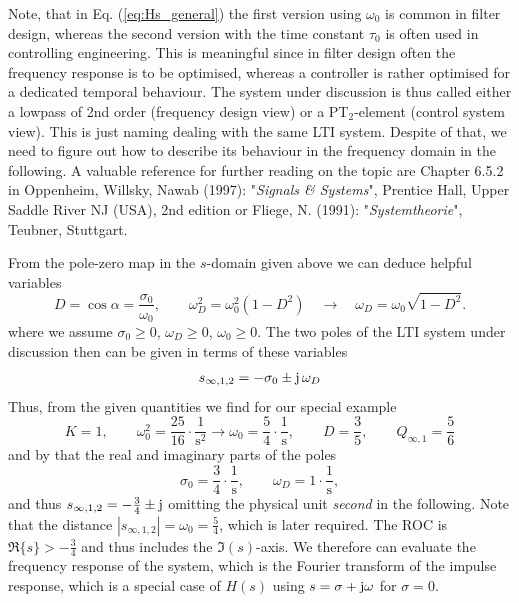 \documentclass[11pt,a4paper,DIV=12]{scrartcl}
\numberwithin{equation}{section}
\numberwithin{figure}{section}
\newcommand{\eq}[1]{Eq. (\ref{#1})} %
\begin{document}
\begin{mdframed}
Note, that in \eq{eq:Hs_general} the first version using $\omega_0$ is
common in filter design, whereas the second version with the time
constant $\tau_0$ is often used in controlling engineering.
%
This is meaningful since in filter design often the frequency response is to be
optimised, whereas a controller is rather optimised for a dedicated
temporal behaviour.
%
The system under discussion is thus called either a lowpass of 2nd order
(frequency design view) or a PT$_2$-element (control system view).
This is just naming dealing with the same LTI system.
Despite of that, we need to figure out how to describe its behaviour in the
frequency domain in the following.
A valuable reference for further reading on the topic are Chapter 6.5.2
in Oppenheim, Willsky, Nawab (1997): "\textit{Signals \& Systems}", Prentice Hall,
Upper Saddle River NJ (USA), 2nd edition
or Fliege, N. (1991): "\textit{Systemtheorie}", Teubner, Stuttgart.
%
%
%

From the pole-zero map in the $s$-domain given above
we can deduce helpful variables
\begin{equation}
D = \cos \alpha = \frac{\sigma_0}{\omega_0},\qquad
\omega_D^2 = \omega_0^2 (1-D^2) \quad \rightarrow \quad \omega_D = \omega_0
\sqrt{1-D^2}.
\end{equation}
where we assume $\sigma_0\geq 0$, $\omega_D\geq 0$, $\omega_0\geq 0$.
%
The two poles of the LTI system under discussion then can be given in terms of
these variables
\begin{align}
s_{\infty,1,2} = -\sigma_0 \pm \im\,\omega_D
\end{align}
%
Thus, from the given quantities we find for our special example
\begin{equation}
K=1, \qquad \omega_0^2 = \frac{25}{16} \cdot \frac{1}{\text{s}^2}
\rightarrow \omega_0 = \frac{5}{4} \cdot \frac{\text{1}}{\text{s}},
\qquad D = \frac{3}{5},\qquad
Q_{\infty,1} = \frac{5}{6}
\end{equation}
and by that the real and imaginary parts of the poles
\begin{equation}
\sigma_0 = \frac{3}{4}\cdot \frac{\text{1}}{\text{s}},\qquad
\omega_D = 1 \cdot \frac{\text{1}}{\text{s}},
\end{equation}
%
and thus $s_{\infty,1,2} = -\frac{3}{4} \pm \im$
omitting the physical unit \textit{second} in the following.
%
Note that the distance $|s_{\infty,1,2}| = \omega_0=\frac{5}{4}$, which is later required.
%
The ROC is $\Re\{s\}>-\frac{3}{4}$ and thus includes the $\Im(s)$-axis.
%
We therefore can evaluate the frequency response of the system, which is the
Fourier transform of the impulse response,
which is a special case of $H(s)$ using $s=\sigma+\im\omega$ for $\sigma=0$.
\end{mdframed}
\end{document}
